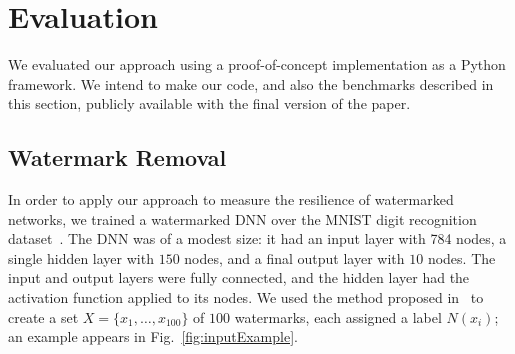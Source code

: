 \documentclass{easychair}
\newcommand{\relu}{\text{ReLU}\xspace{}}
\begin{document}
\section{Evaluation}
\label{sec:evaluation}

We evaluated our approach using a proof-of-concept implementation
as a Python framework. We intend to make our code, and also the
benchmarks described in this section, publicly available with the
final version of the paper.


\subsection{Watermark Removal}

In order to apply our approach to measure the resilience of
watermarked networks, we trained a watermarked DNN over the MNIST
digit recognition dataset~\cite{mnist}. The DNN was of a modest size:
it had an input layer with 784 nodes, a single hidden layer with $150$
nodes, and a final output layer with $10$ nodes. The input and output layers were fully
connected, and the hidden layer had the \relu{} activation function
applied to its nodes. We used the
method proposed in~\cite{AdBaPiKeWatermarking} to create a set
$X=\{x_1,\ldots, x_{100}\}$ of $100$ watermarks, each assigned a label
$N(x_i)$; an example appears in Fig.~\ref{fig:inputExample}.
\end{document}
